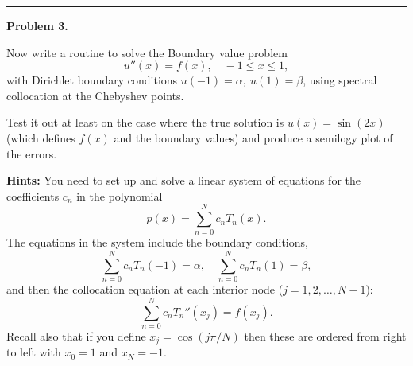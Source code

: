 \documentclass[10pt]{article}
\begin{document}



\vskip 1cm
\hrule
{\bf Problem 3.}

Now write a routine to solve the Boundary value problem
\[
u''(x) = f(x), \quad -1\leq x \leq 1,
\]
with Dirichlet boundary conditions $u(-1)=\alpha, ~ u(1)=\beta$, using
spectral collocation at the Chebyshev points.

Test it out at least on the case where the true solution is $u(x) =
\sin(2x)$ (which defines $f(x)$ and the boundary values)
and produce a semilogy plot of the errors.

{\bf Hints:} You need to set up and solve a linear system of equations for
the coefficients $c_n$ in the polynomial
\[
p(x) = \sum_{n=0}^N c_n T_n(x).
\]
The equations in the system include the boundary conditions,
\[
\sum_{n=0}^N c_n T_n(-1) = \alpha, \quad 
\sum_{n=0}^N c_n T_n(1) = \beta,
\]
and then the collocation equation at each interior node ($j=1,2,\ldots,N-1$):
\[
\sum_{n=0}^N c_n T_n''(x_j) = f(x_j).
\]
Recall also that if you define $x_j = \cos(j \pi/N)$ then these are ordered from
right to left with $x_0=1$ and $x_N=-1$.




\end{document}
